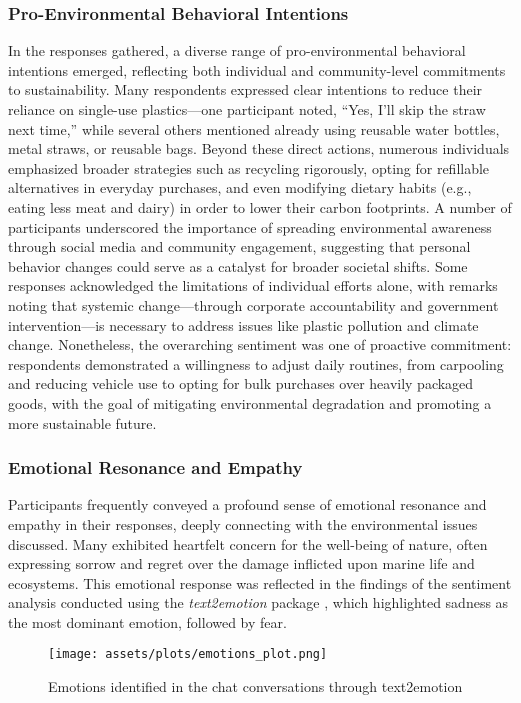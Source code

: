 \documentclass[sigconf, nonacm]{acmart}
\begin{document}
\subsubsection{Pro-Environmental Behavioral Intentions}
In the responses gathered, a diverse range of pro-environmental behavioral intentions emerged, reflecting both individual and community-level commitments to sustainability. Many respondents expressed clear intentions to reduce their reliance on single-use plastics—one participant noted, “Yes, I'll skip the straw next time,” while several others mentioned already using reusable water bottles, metal straws, or reusable bags. Beyond these direct actions, numerous individuals emphasized broader strategies such as recycling rigorously, opting for refillable alternatives in everyday purchases, and even modifying dietary habits (e.g., eating less meat and dairy) in order to lower their carbon footprints. A number of participants underscored the importance of spreading environmental awareness through social media and community engagement, suggesting that personal behavior changes could serve as a catalyst for broader societal shifts. Some responses acknowledged the limitations of individual efforts alone, with remarks noting that systemic change—through corporate accountability and government intervention—is necessary to address issues like plastic pollution and climate change. Nonetheless, the overarching sentiment was one of proactive commitment: respondents demonstrated a willingness to adjust daily routines, from carpooling and reducing vehicle use to opting for bulk purchases over heavily packaged goods, with the goal of mitigating environmental degradation and promoting a more sustainable future.


\subsubsection{Emotional Resonance and Empathy}
Participants frequently conveyed a profound sense of emotional resonance and empathy in their responses, deeply connecting with the environmental issues discussed. Many exhibited heartfelt concern for the well-being of nature, often expressing sorrow and regret over the damage inflicted upon marine life and ecosystems. This emotional response was reflected in the findings of the sentiment analysis conducted using the \textit{text2emotion} package \cite{Gupta2021}, which highlighted sadness as the most dominant emotion, followed by fear.

\begin{figure}
    \centering
    \texttt{[image: assets/plots/emotions\_plot.png]}
    \caption{Emotions identified in the chat conversations through text2emotion}
    \label{fig:text2emotion}
\end{figure}
\end{document}

